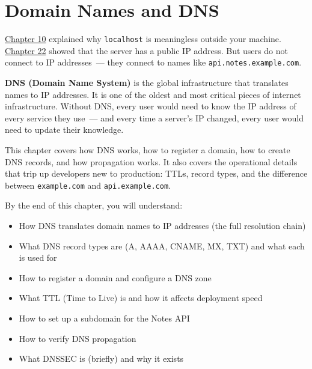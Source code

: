 \setcounter{chapter}{26}
\chapter{Domain Names and DNS}\label{ch:27-domain-and-dns}

\chapterrule

\hyperref[ch:10-networking-limitations]{Chapter 10} explained why \texttt{localhost} is meaningless outside your machine. \hyperref[ch:22-network-configuration]{Chapter 22} showed that the server has a public IP address. But users do not connect to IP addresses~--- they connect to names like \texttt{api.notes.example.com}.

\textbf{DNS (Domain Name System)} is the global infrastructure that translates names to IP addresses. It is one of the oldest and most critical pieces of internet infrastructure. Without DNS, every user would need to know the IP address of every service they use~--- and every time a server's IP changed, every user would need to update their knowledge.

This chapter covers how DNS works, how to register a domain, how to create DNS records, and how propagation works. It also covers the operational details that trip up developers new to production: TTLs, record types, and the difference between \texttt{example.com} and \texttt{api.example.com}.

\begin{objectives}

By the end of this chapter, you will understand:

\begin{itemize}
\tightlist
\item
  How DNS translates domain names to IP addresses (the full resolution chain)
\item
  What DNS record types are (A, AAAA, CNAME, MX, TXT) and what each is used for
\item
  How to register a domain and configure a DNS zone
\item
  What TTL (Time to Live) is and how it affects deployment speed
\item
  How to set up a subdomain for the Notes API
\item
  How to verify DNS propagation
\item
  What DNSSEC is (briefly) and why it exists
\end{itemize}

\end{objectives}

